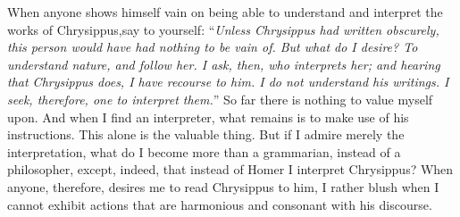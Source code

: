 When anyone shows himself vain on being able to understand and interpret
the works of Chrysippus,\footnotemark say to yourself: ``\emph{Unless Chrysippus had
written obscurely, this person would have had nothing to be vain of. But
what do I desire? To understand nature, and follow her. I ask, then, who
interprets her; and hearing that Chrysippus does, I have recourse to him.
I do not understand his writings. I seek, therefore, one to interpret
\emph{them}.}'' So far there is nothing to value myself upon. And when I find an
interpreter, what remains is to make use of his instructions. This alone
is the valuable thing. But if I admire merely the interpretation, what do
I become more than a grammarian, instead of a philosopher, except,
indeed, that instead of Homer I interpret Chrysippus? When anyone,
therefore, desires me to read Chrysippus to him, I rather blush when I
cannot exhibit actions that are harmonious and consonant with his
discourse.

